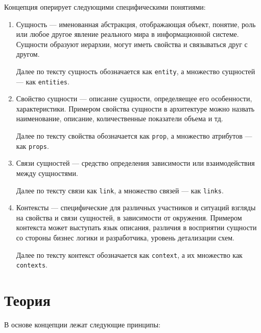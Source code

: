 \documentclass[final]{article}
\begin{document}
        Концепция оперирует следующими специфическими понятиями:

        \begin{enumerate}

            \item Сущность — именованная абстракция, отображающая объект, 
            понятие, роль или любое другое явление реального мира в 
            информационной системе. Сущности образуют иерархии, могут иметь 
            свойства и связываться друг с другом.

            Далее по тексту сущность обозначается как \texttt{entity}, а 
            множество сущностей — как \texttt{entities}.

            \item Свойство сущности — описание сущности, определяещее его 
            особенности, характеристики. Примером свойства сущности в 
            архитектуре можно назвать наименование, описание, количественные 
            показатели объема и тд.

            Далее по тексту свойства обозначается как \texttt{prop}, а множество 
            атрибутов — как \texttt{props}.

            \item Связи сущностей — средство определения зависимости или
            взаимодействия между сущностями. 

            Далее по тексту связи как \texttt{link}, а множество 
            связей — как \texttt{links}.

            \item Контексты — специфические для различных участников и ситуаций 
            взгляды на свойства и связи сущностей, в зависимости от окружения. 
            Примером контекста может выступать язык описания, различия в 
            восприятии сущности со стороны бизнес логики и разработчика, уровень 
            детализации схем.

            Далее по тексту контекст обозначается как \texttt{context}, а их 
            множество как \texttt{contexts}.

        \end{enumerate}

    \section{Теория}

        В основе концепции лежат следующие принципы:
\end{document}
